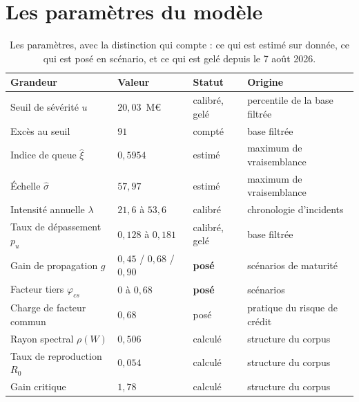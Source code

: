 \documentclass[12pt,a4paper]{article}
\theoremstyle{definition}
\begin{document}
\section{Les paramètres du modèle}
\label{ann:parametres}

\begin{table}[htbp]
\centering\small
\renewcommand{\arraystretch}{1.2}
\begin{tabular}{@{}>{\raggedright\arraybackslash}p{4.2cm}>{\raggedright\arraybackslash}p{3.4cm}>{\raggedright\arraybackslash}p{2.6cm}>{\raggedright\arraybackslash}p{3.6cm}@{}}
\toprule
\textbf{Grandeur} & \textbf{Valeur} & \textbf{Statut} & \textbf{Origine} \\
\midrule
Seuil de sévérité $u$          & $20{,}03$~M\euro   & calibré, gelé & percentile de la base filtrée \\
Excès au seuil                 & $91$               & compté        & base filtrée \\
Indice de queue $\hat\xi$      & $0{,}5954$         & estimé        & maximum de vraisemblance \\
Échelle $\hat\sigma$           & $57{,}97$          & estimé        & maximum de vraisemblance \\
Intensité annuelle $\lambda$   & $21{,}6$ à $53{,}6$ & calibré      & chronologie d'incidents \\
Taux de dépassement $p_u$      & $0{,}128$ à $0{,}181$ & calibré, gelé & base filtrée \\
Gain de propagation $g$        & $0{,}45$ / $0{,}68$ / $0{,}90$ & \textbf{posé} & scénarios de maturité \\
Facteur tiers $\varphi_{cs}$   & $0$ à $0{,}68$     & \textbf{posé} & scénarios \\
Charge de facteur commun       & $0{,}68$           & posé          & pratique du risque de crédit \\
Rayon spectral $\rho(W)$       & $0{,}506$          & calculé       & structure du corpus \\
Taux de reproduction $R_0$     & $0{,}054$          & calculé       & structure du corpus \\
Gain critique                  & $1{,}78$           & calculé       & structure du corpus \\
\bottomrule
\end{tabular}
\caption{Les paramètres, avec la distinction qui compte : ce qui est estimé sur
donnée, ce qui est posé en scénario, et ce qui est gelé depuis le 7 août 2026.}
\label{tab:parametres}
\end{table}
\end{document}
